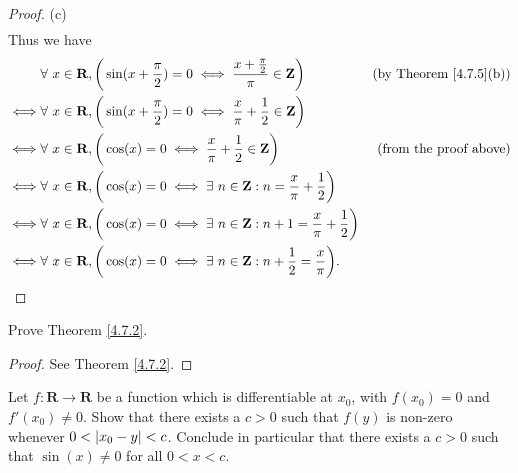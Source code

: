 \begin{proof}{(c)}
\begin{align*}
    \end{align*}
    Thus we have
    \begin{align*}
             & \forall\ x \in \mathbf{R}, \bigg(\sin(x + \frac{\pi}{2}) = 0 \iff \frac{x + \frac{\pi}{2}}{\pi} \in \mathbf{Z}\bigg)    & \text{(by Theorem \ref{4.7.5}(b))} \\
        \iff & \forall\ x \in \mathbf{R}, \bigg(\sin(x + \frac{\pi}{2}) = 0 \iff \frac{x}{\pi} + \frac{1}{2} \in \mathbf{Z}\bigg)                                           \\
        \iff & \forall\ x \in \mathbf{R}, \bigg(\cos(x) = 0 \iff \frac{x}{\pi} + \frac{1}{2} \in \mathbf{Z}\bigg)                      & \text{(from the proof above)}      \\
        \iff & \forall\ x \in \mathbf{R}, \bigg(\cos(x) = 0 \iff \exists\ n \in \mathbf{Z} : n = \frac{x}{\pi} + \frac{1}{2}\bigg)                                          \\
        \iff & \forall\ x \in \mathbf{R}, \bigg(\cos(x) = 0 \iff \exists\ n \in \mathbf{Z} : n + 1 = \frac{x}{\pi} + \frac{1}{2}\bigg)                                      \\
        \iff & \forall\ x \in \mathbf{R}, \bigg(\cos(x) = 0 \iff \exists\ n \in \mathbf{Z} : n + \frac{1}{2} = \frac{x}{\pi}\bigg).
    \end{align*}
\end{proof}

\exercisesection

\begin{exercise}\label{ex 4.7.1}
    Prove Theorem \ref{4.7.2}.
\end{exercise}

\begin{proof}
    See Theorem \ref{4.7.2}.
\end{proof}

\begin{exercise}\label{ex 4.7.2}
    Let \(f : \mathbf{R} \to \mathbf{R}\) be a function which is differentiable at \(x_0\), with \(f(x_0) = 0\) and \(f'(x_0) \neq 0\).
    Show that there exists a \(c > 0\) such that \(f(y)\) is non-zero whenever \(0 < \abs*{x_0 - y} < c\).
    Conclude in particular that there exists a \(c > 0\) such that \(\sin(x) \neq 0\) for all \(0 < x < c\).
\end{exercise}

